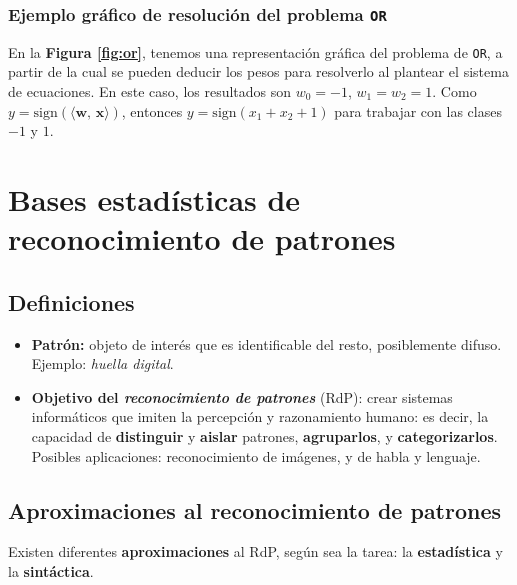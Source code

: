 \documentclass[10pt,a4paper]{article}
\begin{document}
\subsubsection{Ejemplo gráfico de resolución del problema \texttt{OR}}

En la \textbf{Figura \ref{fig:or}}, tenemos una representación gráfica del problema de \texttt{OR}, a partir de la cual se pueden deducir los pesos para resolverlo al plantear el sistema de ecuaciones. En este caso, los resultados son $w_0=-1$, $w_1=w_2=1$. Como $y=\text{sign} (\langle \mathbf{w}, \, \mathbf{x}\rangle)$, entonces $y = \text{sign}(x_1 + x_2 + 1)$ para trabajar con las clases $-1$ y $1$.


\section{Bases estadísticas de reconocimiento de patrones}

\subsection{Definiciones}

\begin{itemize}
\item \textbf{Patrón:} objeto de interés que es identificable del resto, posiblemente difuso. Ejemplo: \textit{huella digital}.

\item \textbf{Objetivo del \textit{reconocimiento de patrones}} (RdP): crear sistemas informáticos que imiten la percepción y razonamiento humano: es decir, la capacidad de \textbf{distinguir} y \textbf{aislar} patrones, \textbf{agruparlos}, y \textbf{categorizarlos}. Posibles aplicaciones: reconocimiento de imágenes, y de habla y lenguaje.
\end{itemize}

\subsection{Aproximaciones al reconocimiento de patrones}

Existen diferentes \textbf{aproximaciones} al RdP, según sea la tarea: la \textbf{estadística} y la \textbf{sintáctica}.
\end{document}
